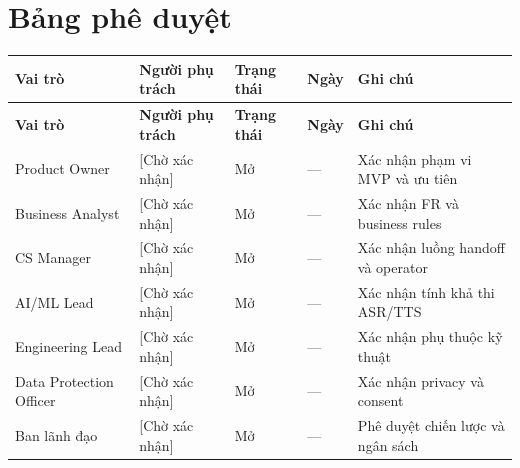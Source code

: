 \documentclass[12pt,a4paper]{article}
\newcommand{\statusopen}{\colorbox{PrioMust}{\small Mở}}
\begin{document}
\section*{Bảng phê duyệt}
\begin{longtable}{L{2.8cm} L{3cm} C{2.5cm} C{2.2cm} L{3.5cm}}
  \toprule
  \textbf{Vai trò}&\textbf{Người phụ trách}&\textbf{Trạng thái}&\textbf{Ngày}&\textbf{Ghi chú}\\
  \midrule\endfirsthead
  \toprule{}\textbf{Vai trò}&\textbf{Người phụ trách}&\textbf{Trạng thái}&\textbf{Ngày}&\textbf{Ghi chú}\\\midrule\endhead\bottomrule\endlastfoot
  Product Owner & [Chờ xác nhận] & \statusopen & --- & Xác nhận phạm vi MVP và ưu tiên \\
  Business Analyst & [Chờ xác nhận] & \statusopen & --- & Xác nhận FR và business rules \\
  CS Manager & [Chờ xác nhận] & \statusopen & --- & Xác nhận luồng handoff và operator \\
  AI/ML Lead & [Chờ xác nhận] & \statusopen & --- & Xác nhận tính khả thi ASR/TTS \\
  Engineering Lead & [Chờ xác nhận] & \statusopen & --- & Xác nhận phụ thuộc kỹ thuật \\
  Data Protection Officer & [Chờ xác nhận] & \statusopen & --- & Xác nhận privacy và consent \\
  Ban lãnh đạo & [Chờ xác nhận] & \statusopen & --- & Phê duyệt chiến lược và ngân sách \\
\end{longtable}

\end{document}
